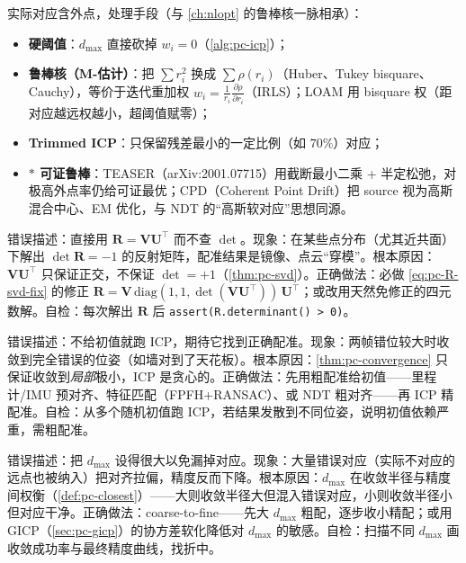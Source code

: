 实际对应含外点，处理手段（与 \cref{ch:nlopt} 的鲁棒核一脉相承）：
\begin{itemize}
  \item \textbf{硬阈值}：$d_{\max}$ 直接砍掉 $w_i=0$（\cref{alg:pc-icp}）；
  \item \textbf{鲁棒核（M-估计）}：把 $\sum r_i^2$ 换成 $\sum\rho(r_i)$（Huber、Tukey bisquare、Cauchy），等价于迭代重加权 $w_i=\frac{1}{r_i}\frac{\partial\rho}{\partial r_i}$（IRLS）；LOAM 用 bisquare 权（距对应越远权越小，超阈值赋零）；
  \item \textbf{Trimmed ICP}：只保留残差最小的一定比例（如 $70\%$）对应；
  \item \textbf{$*$ 可证鲁棒}：TEASER\cite{yang2021teaser}（arXiv:2001.07715）用截断最小二乘 + 半定松弛，对极高外点率仍给可证最优；CPD\cite{myronenko2010cpd}（Coherent Point Drift）把 source 视为高斯混合中心、EM 优化，与 NDT 的“高斯软对应”思想同源。
\end{itemize}

\begin{pitfall}
错误描述：直接用 $\mathbf{R}=\mathbf{V}\mathbf{U}^\top$ 而不查 $\det$。现象：在某些点分布（尤其近共面）下解出 $\det\mathbf{R}=-1$ 的反射矩阵，配准结果是镜像、点云“穿模”。根本原因：$\mathbf{V}\mathbf{U}^\top$ 只保证正交，不保证 $\det=+1$（\cref{thm:pc-svd}）。正确做法：必做 \cref{eq:pc-R-svd-fix} 的修正 $\mathbf{R}=\mathbf{V}\,\mathrm{diag}(1,1,\det(\mathbf{V}\mathbf{U}^\top))\,\mathbf{U}^\top$；或改用天然免修正的四元数解。自检：每次解出 $\mathbf{R}$ 后 \texttt{assert(R.determinant() > 0)}。
\end{pitfall}

\begin{pitfall}
错误描述：不给初值就跑 ICP，期待它找到正确配准。现象：两帧错位较大时收敛到完全错误的位姿（如墙对到了天花板）。根本原因：\cref{thm:pc-convergence} 只保证收敛到\emph{局部}极小，ICP 是贪心的。正确做法：先用粗配准给初值——里程计/IMU 预对齐、特征匹配（FPFH+RANSAC）、或 NDT 粗对齐——再 ICP 精配准。自检：从多个随机初值跑 ICP，若结果发散到不同位姿，说明初值依赖严重，需粗配准。
\end{pitfall}

\begin{pitfall}
错误描述：把 $d_{\max}$ 设得很大以免漏掉对应。现象：大量错误对应（实际不对应的远点也被纳入）把对齐拉偏，精度反而下降。根本原因：$d_{\max}$ 在收敛半径与精度间权衡（\cref{def:pc-closest}）——大则收敛半径大但混入错误对应，小则收敛半径小但对应干净。正确做法：coarse-to-fine——先大 $d_{\max}$ 粗配，逐步收小精配；或用 GICP（\cref{sec:pc-gicp}）的协方差软化降低对 $d_{\max}$ 的敏感。自检：扫描不同 $d_{\max}$ 画收敛成功率与最终精度曲线，找折中。
\end{pitfall}


